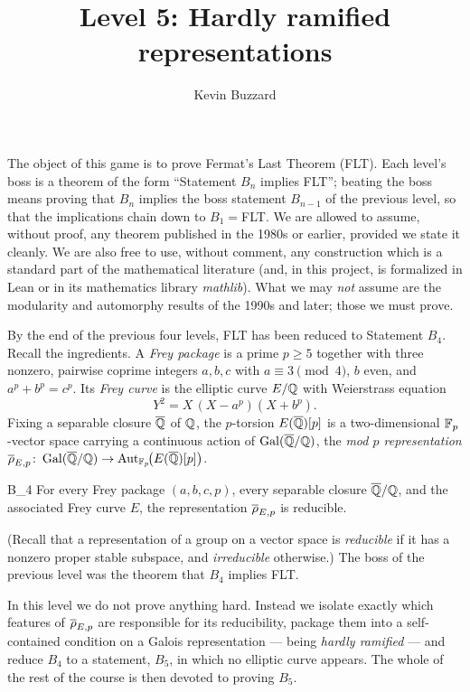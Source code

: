 \documentclass[11pt]{article}
\title{Level 5: Hardly ramified representations}
\author{Kevin Buzzard}
\date{}
\begin{document}
\maketitle

\noindent
The object of this game is to prove Fermat's Last Theorem (FLT). Each level's
boss is a theorem of the form ``Statement $B_n$ implies FLT''; beating the
boss means proving that $B_n$ implies the boss statement $B_{n-1}$ of the
previous level, so that the implications chain down to $B_1={}$FLT. We are
allowed to assume, without proof, any theorem published in the 1980s or
earlier, provided we state it cleanly. We are also free to use, without
comment, any construction which is a standard part of the mathematical
literature (and, in this project, is formalized in Lean or in its mathematics
library \emph{mathlib}). What we may \emph{not} assume are the modularity and
automorphy results of the 1990s and later; those we must prove.

\medskip\noindent
By the end of the previous four levels, FLT has been reduced to Statement
$B_4$. Recall the ingredients.
A \emph{Frey package} is a prime $p\geq 5$ together with three nonzero,
pairwise coprime integers $a,b,c$ with $a\equiv 3\pmod 4$, $b$ even, and
$a^p+b^p=c^p$. Its \emph{Frey curve} is the elliptic curve $E/\mathbb{Q}$ with
Weierstrass equation
\[
  Y^2 = X\,(X-a^p)(X+b^p).
\]
Fixing a separable closure $\overline{\mathbb{Q}}$ of $\mathbb{Q}$, the $p$-torsion $E(\overline{\mathbb{Q}})[p]$ is a
two-dimensional $\mathbb{F}_p$-vector space carrying a continuous action of
$\operatorname{Gal}(\overline{\mathbb{Q}}/\mathbb{Q})$, the \emph{mod $p$ representation}
$\overline{\rho}_{E,p}\colon\operatorname{Gal}(\overline{\mathbb{Q}}/\mathbb{Q})\to\operatorname{Aut}_{\mathbb{F}_p}\!\bigl(E(\overline{\mathbb{Q}})[p]\bigr)$.

\begin{Bn}{B_4}
For every Frey package $(a,b,c,p)$, every separable closure $\overline{\mathbb{Q}}/\mathbb{Q}$, and the
associated Frey curve $E$, the representation $\overline{\rho}_{E,p}$ is reducible.
\end{Bn}

\noindent
(Recall that a representation of a group on a vector space is \emph{reducible}
if it has a nonzero proper stable subspace, and \emph{irreducible} otherwise.)
The boss of the previous level was the theorem that $B_4$ implies FLT.

\medskip\noindent
In this level we do not prove anything hard. Instead we isolate exactly which
features of $\overline{\rho}_{E,p}$ are responsible for its reducibility, package them
into a self-contained condition on a Galois representation --- being
\emph{hardly ramified} --- and reduce $B_4$ to a statement, $B_5$, in which no
elliptic curve appears. The whole of the rest of the course is then devoted to
proving $B_5$.
\end{document}
